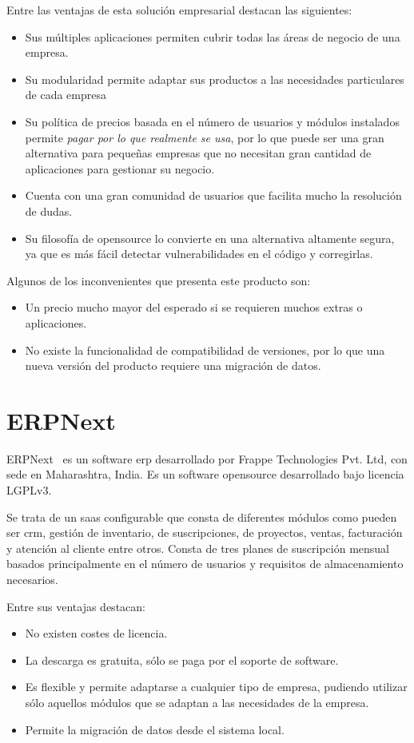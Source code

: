 Entre las ventajas de esta solución empresarial destacan las siguientes:
\begin{itemize}
\item Sus múltiples aplicaciones permiten cubrir todas las áreas de negocio de una empresa.
\item Su modularidad permite adaptar sus productos a las necesidades particulares de cada empresa
\item Su política de precios basada en el número de usuarios y módulos instalados permite \textit{pagar por lo que realmente se usa}, por lo que puede ser una gran alternativa para pequeñas empresas que no necesitan gran cantidad de aplicaciones para gestionar su negocio.
\item Cuenta con una gran comunidad de usuarios que facilita mucho la resolución de dudas. 
\item Su filosofía de \gls{opensource} lo convierte en una alternativa altamente segura, ya que es más fácil detectar vulnerabilidades en el código y corregirlas.
\end{itemize}

Algunos de los inconvenientes que presenta este producto son:
\begin{itemize}
\item Un precio mucho mayor del esperado si se requieren muchos extras o aplicaciones.
\item No existe la funcionalidad de compatibilidad de versiones, por lo que una nueva versión del producto requiere una migración de datos.
\end{itemize}



\section{ERPNext}
\label{sec:estado-arte-erpNext}
ERPNext~\cite{ERPNext} es un software \acrshort{erp} desarrollado por Frappe Technologies Pvt. Ltd, con sede en Maharashtra, India. Es un software \gls{opensource} desarrollado bajo licencia LGPLv3.

Se trata de un \acrshort{saas} configurable que consta de diferentes módulos como pueden ser \acrshort{crm}, gestión de inventario, de suscripciones, de proyectos, ventas, facturación y atención al cliente entre otros. Consta de tres planes de suscripción mensual basados principalmente en el número de usuarios y requisitos de almacenamiento necesarios.

Entre sus ventajas destacan:
\begin{itemize}
\item No existen costes de licencia.
\item La descarga es gratuita, sólo se paga por el soporte de software.
\item Es flexible y permite adaptarse a cualquier tipo de empresa, pudiendo utilizar sólo aquellos módulos que se adaptan a las necesidades de la empresa.
\item Permite la migración de datos desde el sistema local.
\end{itemize}

